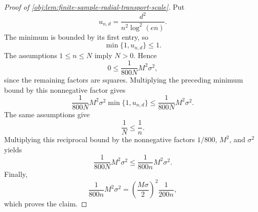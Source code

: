 \begin{proof}[Proof of \cref{obj:lem:finite-sample-radial-transport-scale}]
Put
\[
u_{n,d}=\frac{d^2}{n^2\log^2(en)} .
\]
The minimum is bounded by its first entry, so
\[
\min\{1,u_{n,d}\}\le 1 .
\]
The assumptions \(1\le n\le N\) imply \(N>0\).  Hence
\[
0\le \frac{1}{800N}M^2\sigma^2,
\]
since the remaining factors are squares.  Multiplying the preceding minimum bound by this nonnegative factor gives
\[
\frac{1}{800N}M^2\sigma^2\min\{1,u_{n,d}\}
\le
\frac{1}{800N}M^2\sigma^2 .
\]
The same assumptions give
\[
\frac1N\le \frac1n .
\]
Multiplying this reciprocal bound by the nonnegative factors \(1/800\), \(M^2\), and \(\sigma^2\) yields
\[
\frac{1}{800N}M^2\sigma^2
\le
\frac{1}{800n}M^2\sigma^2 .
\]
Finally,
\[
\frac{1}{800n}M^2\sigma^2
=
\left(\frac{M\sigma}{2}\right)^2\frac{1}{200n},
\]
which proves the claim.
\end{proof}
